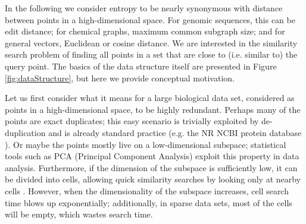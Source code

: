 \documentclass[review,preprint,12pt]{elsarticle}
\renewcommand{\cite}{\citep} %
\theoremstyle{definition}
\theoremstyle{remark}
\numberwithin{equation}{section}
\begin{document}
In the following we consider entropy to be nearly synonymous with distance between points in a high-dimensional space.
For genomic sequences, this can be edit distance; for chemical graphs, maximum common subgraph size; and for general vectors, Euclidean or cosine distance.
We are interested in the similarity search problem of
finding all points in a set that are close to (i.e. similar to) the query point.
The basics of the data structure itself are presented in Figure \ref{fig:dataStructure}, but here we provide conceptual motivation.

Let us first consider what it means for a large biological data set, considered as points in a high-dimensional space, to be highly redundant.
Perhaps many of the points are exact duplicates; this easy scenario is trivially exploited by de-duplication and is already standard practice (e.g. the NR NCBI protein database \cite{pruitt2005ncbi}).
Or maybe the points mostly live on a low-dimensional subspace; statistical tools such as PCA (Principal Component Analysis) exploit this property in data analysis.
Furthermore, if the dimension of the subspace is sufficiently low,
it can be divided into cells, allowing quick similarity searches by looking only at nearby cells \cite{weber1998quantitative}.
However, when the dimensionality of the subspace increases, cell search time blows up exponentially; additionally, in sparse data sets, most of the cells will be empty, which wastes search time.
\end{document}

